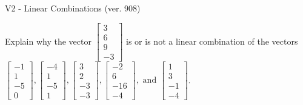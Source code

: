 \begin{exercise}
  \begin{exerciseTitle}V2 - Linear Combinations (ver. 908)\end{exerciseTitle}
  \begin{exerciseStatement}
    Explain why the vector \(\left[\begin{array}{c}
3 \\
6 \\
9 \\
-3
\end{array}\right]\)  is or is not a linear 
	combination of the vectors \(\left[\begin{array}{c}
-1 \\
1 \\
-5 \\
0
\end{array}\right] , \left[\begin{array}{c}
-4 \\
1 \\
-5 \\
1
\end{array}\right] , \left[\begin{array}{c}
3 \\
2 \\
-3 \\
-3
\end{array}\right] , \left[\begin{array}{c}
-2 \\
6 \\
-16 \\
-4
\end{array}\right] , \text{ and } \left[\begin{array}{c}
1 \\
3 \\
-1 \\
-4
\end{array}\right]\).
	



\end{exerciseStatement}
\end{exercise}
